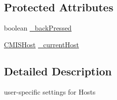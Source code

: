 \subsection*{Protected Attributes}
\begin{DoxyCompactItemize}
\item 
boolean \hyperlink{classcom_1_1zia_1_1freshdocs_1_1activity_1_1_host_preference_activity_a1d92078e62dd96dd159ac84df3d1e88b}{\-\_\-back\-Pressed}
\item 
\hyperlink{classcom_1_1zia_1_1freshdocs_1_1preference_1_1_c_m_i_s_host}{C\-M\-I\-S\-Host} \hyperlink{classcom_1_1zia_1_1freshdocs_1_1activity_1_1_host_preference_activity_ab545ed6d9617d7b34887cb87056211a3}{\-\_\-current\-Host}
\end{DoxyCompactItemize}


\subsection{Detailed Description}
user-\/specific settings for Hosts 

